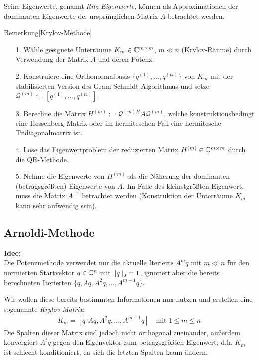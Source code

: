 Seine Eigenwerte, genannt \textit{Ritz-Eigenwerte}, können als Approximationen der dominanten Eigenwerte der 
ursprünglichen Matrix $A$ betrachtet werden. 

\begin{colbox}{Bemerkung}[Krylov-Methode] 
  \begin{enumerate}
    \item[1.] Wähle geeignete Unterräume $K_m\in\mathbb C  ^{m\times m}$, $m\ll n$ (Krylov-Räume) durch Verwendung der 
    Matrix $A$ und deren Potenz.
    \item[2.] Konstruiere eine Orthonormalbasis $\{q^{(1)},\dots, q^{(m)}\}$ von $K_m$ mit der stabilisierten 
    Version des Gram-Schmidt-Algorithmus und setze $\mathcal{Q}^{(m)}:=[q^{(1)},\dots,q^{(m)}]$.
    \item[3.] Berechne die Matrix $H^{(m)}:=\mathcal{Q}^{(m)H}A\mathcal{Q}^{(m)}$, welche 
    konstruktionsbedingt eine Hessenberg-Matrix oder im hermiteschen Fall eine hermitesche Tridiagonalmatrix ist. 
    \item[4.] Löse das Eigenwertproblem der reduzierten Matrix $H^{(m)}\in\mathbb C^{m\times m}$ durch die 
    QR-Methode.
    \item[5.] Nehme die Eigenwerte von $H^{(m)}$ als die Näherung der dominanten (betragsgrößten) Eigenwerte 
    von $A$. Im Falle des kleinstgrößten Eigenwert, muss die Matrix $A^{-1}$ betrachtet werden (Konstruktion 
    der Unterräume $K_m$ kann sehr aufwendig sein).
  \end{enumerate}
\end{colbox}

\subsection{Arnoldi-Methode}
\textbf{Idee:} \\
Die Potenzmethode verwendet nur die aktuelle Iterierte $A^mq$ mit $m\ll n$ für den normierten Startvektor 
$q\in\mathbb C  ^n$ mit $\vertn{2}{q}_2=1$, ignoriert aber die bereits berechneten Iterierten $\{q,Aq,A^2q,\dots,A^{m-1}q\}$.

Wir wollen diese bereits bestimmten Informationen nun nutzen und erstellen eine sogenannte \textit{Krylov-Matrix}:
%
\begin{align*}
  K_m = [q,Aq,A^2q,\dots,A^{m-1}q]
  \quad\text{mit }1\leq m\leq n
\end{align*}
%
Die Spalten dieser Matrix sind jedoch nicht orthogonal zueinander, außerdem konvergiert $A^tq$ gegen den 
Eigenvektor zum betragsgrößten Eigenwert, d.h. $K_m$ ist schlecht konditioniert, da sich die letzten Spalten kaum ändern. 

